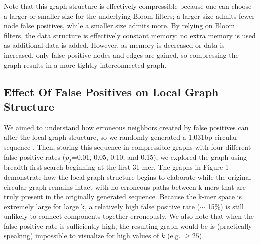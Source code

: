 \documentclass[12pt]{article} \usepackage{simplemargins}
\begin{document}
Note that this graph structure is effectively compressible because one can choose a larger 
or smaller size for the underlying Bloom filters; a larger size admits fewer 
node false positives, while a smaller size admits more. By relying on Bloom 
filters, the data structure is effectively constant memory: no extra memory is 
used as additional data is added. However, as memory is decreased or data 
is increased, only false positive nodes and edges are gained, so 
compressing the graph results in a more tightly interconnected graph.

\subsection{Effect Of False Positives on Local Graph Structure}
We aimed to understand how erroneous neighbors created by false positives can alter 
the local graph structure, so we randomly generated a 1,031bp circular sequence .
Then, storing this sequence in compressible graphs with
four different false positive rates ($p_f$=0.01, 0.05, 0.10, and
0.15), we explored the graph using breadth-first search beginning at
the first 31-mer. 
The graphs in Figure 
1 demonstrate how
the local graph structure begins to elaborate while the original circular
graph remains intact with no erroneous paths between k-mers that are
truly present in the originally generated sequence. Because the k-mer
space is extremely large for large k, a relatively high false positive 
rate ($\sim$ 15\%) is still 
unlikely to connect components
together erroneously. We also note that when the false positive
rate is sufficiently high, the resulting graph would be
is (practically speaking) impossible to visualize for high values of $k$ (e.g. $\ge 25$). 
\end{document}
